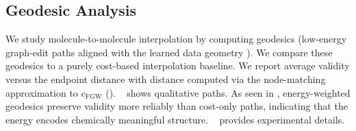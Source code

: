 \subsection{Geodesic Analysis}
We study molecule-to-molecule interpolation by computing geodesics (low-energy graph-edit paths aligned with the learned data geometry \citep{bethune2025follow}). We compare these geodesics to a purely cost-based interpolation baseline. We report average validity versus the endpoint distance with distance computed via the node-matching approximation to $c_{\mathrm{FGW}}$ (). ~ shows qualitative paths. As seen in , energy-weighted geodesics preserve validity more reliably than cost-only paths, indicating that the energy encodes chemically meaningful structure. ~ provides experimental details. 


